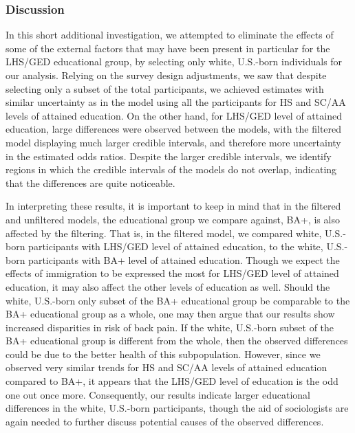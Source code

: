 \FloatBarrier
\subsubsection{Discussion}
\label{section:application2:extension:discussion}
In this short additional investigation, we attempted to eliminate the effects of some of the external factors that may have been present in particular for the LHS/GED educational group, by selecting only white, U.S.-born individuals for our analysis. Relying on the survey design adjustments, we saw that despite selecting only a subset of the total participants, we achieved estimates with similar uncertainty as in the model using all the participants for HS and SC/AA levels of attained education. On the other hand, for LHS/GED level of attained education, large differences were observed between the models, with the filtered model displaying much larger credible intervals, and therefore more uncertainty in the estimated odds ratios. Despite the larger credible intervals, we identify regions in which the credible intervals of the models do not overlap, indicating that the differences are quite noticeable. 

In interpreting these results, it is important to keep in mind that in the filtered and unfiltered models, the educational group we compare against, BA+, is also affected by the filtering. That is, in the filtered model, we compared white, U.S.-born participants with LHS/GED level of attained education, to the white, U.S.-born participants with BA+ level of attained education. Though we expect the effects of immigration to be expressed the most for LHS/GED level of attained education, it may also affect the other levels of education as well. Should the white, U.S.-born only subset of the BA+ educational group be comparable to the BA+ educational group as a whole, one may then argue that our results show increased disparities in risk of back pain. If the white, U.S.-born subset of the BA+ educational group is different from the whole, then the observed differences could be due to the better health of this subpopulation. However, since we observed very similar trends for HS and SC/AA levels of attained education compared to BA+, it appears that the LHS/GED level of education is the odd one out once more. Consequently, our results indicate larger educational differences in the white, U.S.-born participants, though the aid of sociologists are again needed to further discuss potential causes of the observed differences. 















